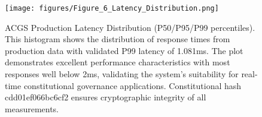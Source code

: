 \documentclass[manuscript,screen,9pt]{acmart}
\begin{document}
\FloatBarrier %
\begin{figure}[!htb]
	\centering
	\texttt{[image: figures/Figure\_6\_Latency\_Distribution.png]}
	\caption[ACGS Production Latency Distribution]{ACGS Production Latency Distribution (P50/P95/P99 percentiles). This histogram shows the distribution of response times from production data with validated P99 latency of 1.081ms. The plot demonstrates excellent performance characteristics with most responses well below 2ms, validating the system's suitability for real-time constitutional governance applications. Constitutional hash cdd01ef066bc6cf2\cite{perf-report} ensures cryptographic integrity of all measurements.}
	\label{fig:latency_distribution}
\end{figure}
\end{document}
